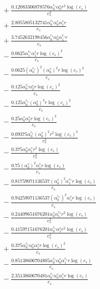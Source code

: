 \documentclass[10pt]{article}
\begin{document}
\begin{align*}
&{}  + \frac{0.12083306878576 \alpha_{0}^{c_s} \alpha_{0}^s r^{3} \log{\left(c_{s} \right)}}{c_{s}^{3}} \\
&{}  + \frac{2.8055805132741 \alpha_{0}^{c_s} \alpha_{0}^s \alpha_{1}^s r}{c_{s}} \\
&{}  + \frac{3.7452632198456 \alpha_{0}^{c_s} \alpha_{0}^s \alpha_{1}^{c_s} r}{c_{s}} \\
&{}  - \frac{0.0625 \alpha_{1}^{c_s} \alpha_{1}^s r \log{\left(c_{s} \right)}^{2}}{c_{s}} \\
&{}  - \frac{0.0625 \left(\alpha_{0}^{c_s}\right)^{2} \left(\alpha_{0}^s\right)^{2} r \log{\left(c_{s} \right)}^{2}}{c_{s}} \\
&{}  - \frac{0.125 \alpha_{0}^{c_s} \alpha_{2}^s r \log{\left(c_{s} \right)}^{2}}{c_{s}} \\
&{}  - \frac{0.125 \alpha_{0}^{c_s} \left(\alpha_{0}^s\right)^{3} r \log{\left(c_{s} \right)}^{2}}{c_{s}} \\
&{}  - \frac{0.25 \alpha_{0}^s \alpha_{2}^s r \log{\left(c_{s} \right)}^{2}}{c_{s}} \\
&{}  - \frac{0.09375 \alpha_{0}^{c_s} \left(\alpha_{0}^s\right)^{2} r^{2} \log{\left(c_{s} \right)}^{2}}{c_{s}^{2}} \\
&{}  - \frac{0.375 \alpha_{0}^s \alpha_{1}^s r^{2} \log{\left(c_{s} \right)}}{c_{s}^{2}} \\
&{}  - \frac{0.75 \left(\alpha_{0}^s\right)^{2} \alpha_{1}^s r \log{\left(c_{s} \right)}}{c_{s}} \\
&{}  - \frac{0.81759071136537 \left(\alpha_{0}^s\right)^{2} \alpha_{1}^{c_s} r \log{\left(c_{s} \right)}}{c_{s}} \\
&{}  - \frac{0.94259071136537 \left(\alpha_{0}^{c_s}\right)^{2} \alpha_{1}^s r \log{\left(c_{s} \right)}}{c_{s}} \\
&{}  - \frac{0.24409651676201 \alpha_{0}^s \alpha_{1}^{c_s} r^{2} \log{\left(c_{s} \right)}}{c_{s}^{2}} \\
&{}  - \frac{0.41597151676201 \alpha_{0}^{c_s} \alpha_{1}^s r^{2} \log{\left(c_{s} \right)}}{c_{s}^{2}} \\
&{}  + \frac{0.375 \alpha_{0}^{c_s} \alpha_{0}^s \alpha_{1}^s r \log{\left(c_{s} \right)}^{2}}{c_{s}} \\
&{}  - \frac{0.85138606704805 \alpha_{0}^{c_s} \alpha_{0}^s \alpha_{1}^{c_s} r \log{\left(c_{s} \right)}}{c_{s}} \\
&{}  - \frac{2.3513860670481 \alpha_{0}^{c_s} \alpha_{0}^s \alpha_{1}^s r \log{\left(c_{s} \right)}}{c_{s}}
\end{align*}
\end{document}
